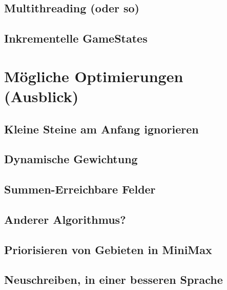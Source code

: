 \documentclass[12pt, draft]{beamer}
\begin{document}
\subsection{Multithreading (oder so)}
\begin{frame}
\end{frame}
\subsection{Inkrementelle GameStates}
\begin{frame}
\end{frame}


\section{Mögliche Optimierungen (Ausblick)}
\subsection{Kleine Steine am Anfang ignorieren}
\begin{frame}
\end{frame}
\subsection{Dynamische Gewichtung}
\begin{frame}
\end{frame}
\subsection{Summen-Erreichbare Felder}
\begin{frame}
\end{frame}
\subsection{Anderer Algorithmus?}
\begin{frame}
\end{frame}
\subsection{Priorisieren von Gebieten in MiniMax}
\begin{frame}
\end{frame}
\subsection{Neuschreiben, in einer besseren Sprache}
\begin{frame}
\end{frame}
\end{document}
